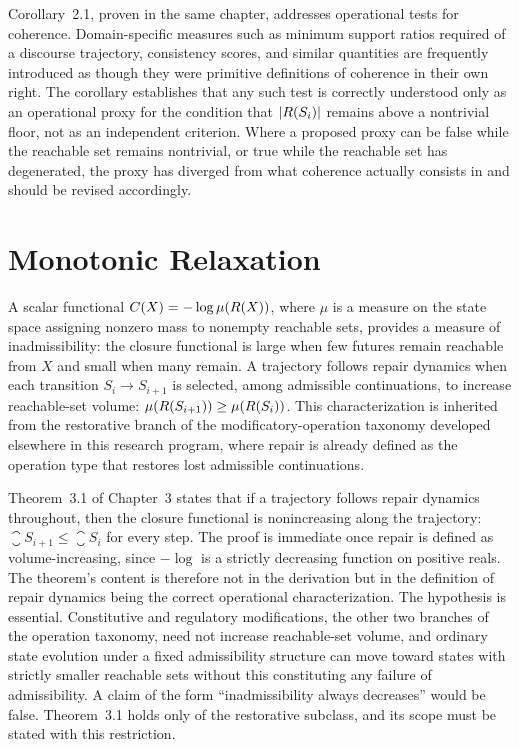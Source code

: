 Corollary~2.1, proven in the same chapter, addresses operational tests for coherence. Domain-specific measures such as minimum support ratios required of a discourse trajectory, consistency scores, and similar quantities are frequently introduced as though they were primitive definitions of coherence in their own right. The corollary establishes that any such test is correctly understood only as an operational proxy for the condition that $|R(S_i)|$ remains above a nontrivial floor, not as an independent criterion. Where a proposed proxy can be false while the reachable set remains nontrivial, or true while the reachable set has degenerated, the proxy has diverged from what coherence actually consists in and should be revised accordingly.

\section{Monotonic Relaxation}

A scalar functional $C(X) = -\log \mu(R(X))$, where $\mu$ is a measure on the state space assigning nonzero mass to nonempty reachable sets, provides a measure of inadmissibility: the closure functional is large when few futures remain reachable from $X$ and small when many remain. A trajectory follows repair dynamics when each transition $S_i \to S_{i+1}$ is selected, among admissible continuations, to increase reachable-set volume: $\mu(R(S_{i+1})) \ge \mu(R(S_i))$. This characterization is inherited from the restorative branch of the modificatory-operation taxonomy developed elsewhere in this research program, where repair is already defined as the operation type that restores lost admissible continuations.

Theorem~3.1 of Chapter~3 states that if a trajectory follows repair dynamics throughout, then the closure functional is nonincreasing along the trajectory: $\closure{S_{i+1}} \le \closure{S_i}$ for every step. The proof is immediate once repair is defined as volume-increasing, since $-\log$ is a strictly decreasing function on positive reals. The theorem's content is therefore not in the derivation but in the definition of repair dynamics being the correct operational characterization. The hypothesis is essential. Constitutive and regulatory modifications, the other two branches of the operation taxonomy, need not increase reachable-set volume, and ordinary state evolution under a fixed admissibility structure can move toward states with strictly smaller reachable sets without this constituting any failure of admissibility. A claim of the form ``inadmissibility always decreases'' would be false. Theorem~3.1 holds only of the restorative subclass, and its scope must be stated with this restriction.

